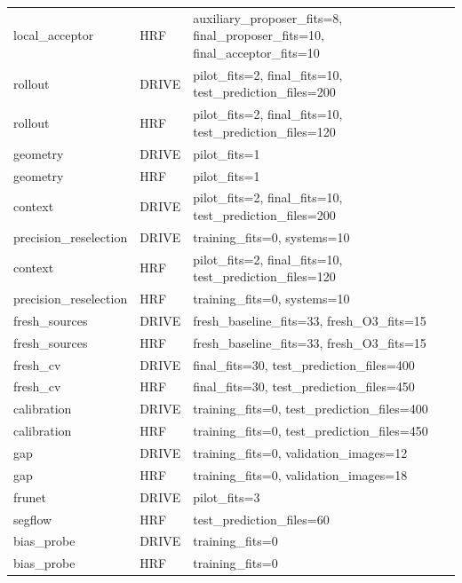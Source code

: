 \documentclass[jimaging,article,submit,pdftex,moreauthors]{Definitions/mdpi}
\begin{document}
\begin{longtable}{@{}>{\raggedright\arraybackslash}p{3.0cm}>{\raggedright\arraybackslash}p{1.4cm}>{\raggedright\arraybackslash}p{11.0cm}@{}}
local\_acceptor & HRF & auxiliary\_proposer\_fits=8, final\_proposer\_fits=10, final\_acceptor\_fits=10\\
rollout & DRIVE & pilot\_fits=2, final\_fits=10, test\_prediction\_files=200\\
rollout & HRF & pilot\_fits=2, final\_fits=10, test\_prediction\_files=120\\
geometry & DRIVE & pilot\_fits=1\\
geometry & HRF & pilot\_fits=1\\
context & DRIVE & pilot\_fits=2, final\_fits=10, test\_prediction\_files=200\\
precision\_reselection & DRIVE & training\_fits=0, systems=10\\
context & HRF & pilot\_fits=2, final\_fits=10, test\_prediction\_files=120\\
precision\_reselection & HRF & training\_fits=0, systems=10\\
fresh\_sources & DRIVE & fresh\_baseline\_fits=33, fresh\_O3\_fits=15\\
fresh\_sources & HRF & fresh\_baseline\_fits=33, fresh\_O3\_fits=15\\
fresh\_cv & DRIVE & final\_fits=30, test\_prediction\_files=400\\
fresh\_cv & HRF & final\_fits=30, test\_prediction\_files=450\\
calibration & DRIVE & training\_fits=0, test\_prediction\_files=400\\
calibration & HRF & training\_fits=0, test\_prediction\_files=450\\
gap & DRIVE & training\_fits=0, validation\_images=12\\
gap & HRF & training\_fits=0, validation\_images=18\\
frunet & DRIVE & pilot\_fits=3\\
segflow & HRF & test\_prediction\_files=60\\
bias\_probe & DRIVE & training\_fits=0\\
bias\_probe & HRF & training\_fits=0\\
\end{longtable}\endgroup
\end{document}

